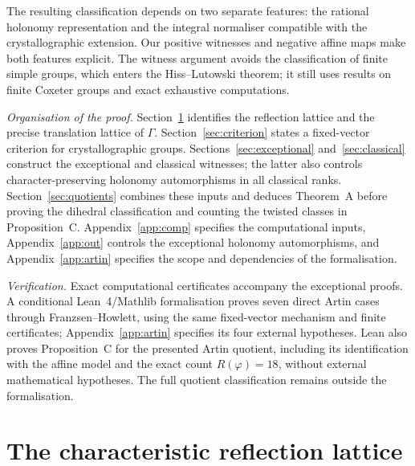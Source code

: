\documentclass[11pt]{article}
\theoremstyle{definition}
\begin{document}
The resulting classification depends on two separate features: the rational holonomy representation
and the integral normaliser compatible with the crystallographic extension. Our positive witnesses
and negative affine maps make both features explicit. The witness argument avoids the classification
of finite simple groups, which enters the Hiss--Lutowski theorem; it still uses results on finite Coxeter
groups and exact exhaustive computations.

\smallskip\noindent\emph{Organisation of the proof.}
Section~\ref{sec:lattice} identifies the reflection lattice and the precise translation lattice of $\Gamma$.
Section~\ref{sec:criterion} states a fixed-vector criterion for crystallographic groups.
Sections~\ref{sec:exceptional} and~\ref{sec:classical} construct the exceptional and classical witnesses;
the latter also controls character-preserving holonomy automorphisms in all classical ranks.
Section~\ref{sec:quotients} combines these inputs and deduces Theorem~A before proving the dihedral classification
and counting the twisted classes in Proposition~C. Appendix~\ref{app:comp} specifies the computational inputs,
Appendix~\ref{app:out} controls the exceptional holonomy automorphisms, and Appendix~\ref{app:artin}
specifies the scope and dependencies of the formalisation.

\smallskip\noindent\emph{Verification.}
Exact computational certificates accompany the exceptional proofs. A conditional Lean~4/Mathlib
formalisation proves seven direct Artin cases through Franzsen--Howlett, using the same fixed-vector mechanism
and finite certificates; Appendix~\ref{app:artin} specifies its four external hypotheses.
Lean also proves Proposition~C for the presented Artin quotient, including its identification
with the affine model and the exact count $R(\varphi)=18$, without external mathematical hypotheses.
The full quotient classification remains outside the formalisation.

\section{The characteristic reflection lattice}\label{sec:lattice}
\end{document}
